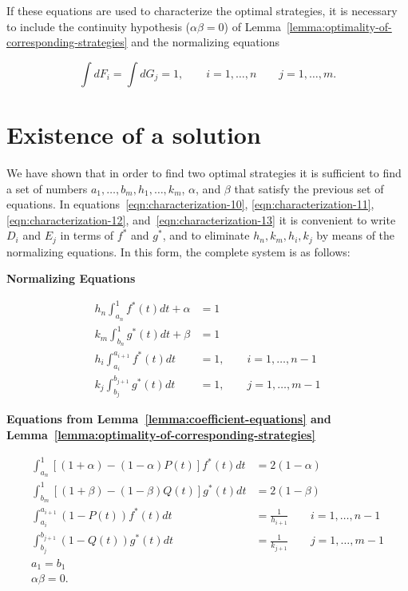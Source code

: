 \documentclass{article}
\begin{document}
If these equations are used to characterize the optimal strategies, it is
necessary to include the continuity hypothesis ($\alpha \beta = 0$) of
Lemma~\ref{lemma:optimality-of-corresponding-strategies} and the normalizing
equations

\[
\int dF_i = \int dG_j = 1, \qquad i = 1, \dots, n \qquad j = 1, \dots, m.
\]

\section{Existence of a solution}

We have shown that in order to find two optimal strategies it is sufficient to
find a set of numbers $a_1, \dots, b_m, h_1, \dots, k_m$, $\alpha$, and
$\beta$ that satisfy the previous set of equations. In
equations~\ref{eqn:characterization-10}, \ref{eqn:characterization-11},
\ref{eqn:characterization-12}, and~\ref{eqn:characterization-13} it is
convenient to write $D_i$ and $E_j$ in terms of $f^*$ and $g^*$, and to
eliminate $h_n, k_m, h_i, k_j$ by means of the normalizing equations. In this
form, the complete system is as follows:

\textbf{Normalizing Equations}

\begin{align}
h_n \int_{a_n}^1 f^*(t) dt + \alpha &= 1 \label{eqn:existence-14} \\
k_m \int_{b_n}^1 g^*(t) dt + \beta &= 1 \label{eqn:existence-15} \\
h_i \int_{a_i}^{a_{i+1}} f^*(t) dt &= 1, \qquad i=1, \dots, n-1 \label{eqn:existence-16} \\
k_j \int_{b_j}^{b_{j+1}} g^*(t) dt &= 1, \qquad j=1, \dots, m-1 \label{eqn:existence-17}
\end{align}

\textbf{Equations from Lemma~\ref{lemma:coefficient-equations} and
Lemma~\ref{lemma:optimality-of-corresponding-strategies}}

\begin{align}
\int_{a_n}^1 \left [ (1+\alpha) - (1-\alpha)P(t) \right ] f^*(t) dt &= 2(1-\alpha) \label{eqn:existence-18} \\
\int_{b_m}^1 \left [ (1+\beta) - (1-\beta)Q(t) \right ] g^*(t) dt &= 2(1-\beta) \label{eqn:existence-19} \\
\int_{a_{i}}^{a_{i+1}} (1-P(t))f^*(t) dt &= \frac{1}{h_{i+1}} \qquad i = 1,
\dots, n-1 \label{eqn:existence-20} \\
\int_{b_{j}}^{b_{j+1}} (1-Q(t))g^*(t) dt &= \frac{1}{k_{j+1}} \qquad j=1,
\dots, m-1 \label{eqn:existence-21} \\
a_1 = b_1 \label{eqn:existence-22} \\
\alpha \beta = 0. \label{eqn:existence-23}
\end{align}
\end{document}
